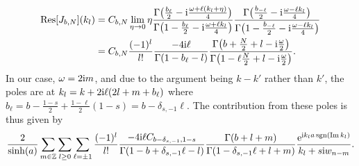 \begin{align*}
\Res[J_{b,N}](k_l) &= C_{b,N} \lim_{\eta\rightarrow 0} \eta \frac{\Gamma\kla[\big]{\frac{b_{\ell}}{2} - \i \frac{\omega + \ell (k_l + \eta)}{4}}}{\Gamma\kla[\big]{1 - \frac{b_{\ell}}{2} - \i \frac{\omega + \ell k_l}{4}}} \frac{\Gamma\kla[\big]{\frac{b_{-\ell}}{2} - \i \frac{\omega - \ell k_l}{4}}}{\Gamma\kla[\big]{1 - \frac{b_{-\ell}}{2} - \i \frac{\omega - \ell k_l}{4}}}\\
&= C_{b,N} \frac{(-1)^l}{l!} \frac{-4\i \ell}{\Gamma\kla{1 - b_\ell - l}} \frac{\Gamma\kla[\big]{b + \frac{N}{2} + l -\i \frac{\omega}{2}}}{\Gamma\kla[\big]{1 - \ell \frac{N}{2} + l -\i \frac{\omega}{2}}}.
\end{align*}
In our case, $\omega=2\text{i} m$, and due to the argument being $k-k'$ rather than $k'$, the poles are at $k_l = k + 2\text{i}\ell (2l+m+b_\ell)$ where $b_\ell = b - \frac{1-s}{2} + \frac{1-\ell}{2}(1-s) = b - \delta_{s,-1} \ell$.
The contribution from these poles is thus given by
\begin{align*}
\frac{2}{\sinh(a)} \sum_{m\in\mathbb{Z}} \sum_{l\ge 0} \sum_{\ell=\pm 1} \frac{(-1)^l}{l!} \frac{-4\i\ell C_{b - \delta_{s,-1},1-s} }{\Gamma(1-b + \delta_{s,-1}\ell - l)} \frac{\Gamma\kla*{b + l +m}}{\Gamma\kla*{1 - \delta_{s,-1} \ell + l +m}} \frac{\powe{\i k_l a \sgn(\Im k_l)}}{k_l + s\i w_{n-m}}.
\end{align*}
